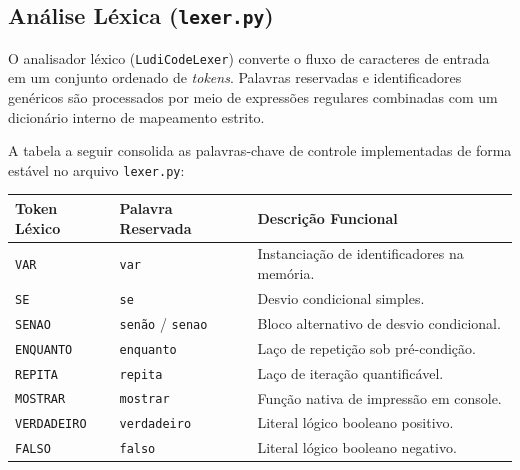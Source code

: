 \documentclass[12pt,a4paper]{article}
\begin{document}
\begin{center}
\end{center}

\subsection{Análise Léxica (\texttt{lexer.py})}

O analisador léxico (\texttt{LudiCodeLexer}) converte o fluxo de caracteres de entrada em um conjunto ordenado de \textit{tokens}. Palavras reservadas e identificadores genéricos são processados por meio de expressões regulares combinadas com um dicionário interno de mapeamento estrito.

A tabela a seguir consolida as palavras-chave de controle implementadas de forma estável no arquivo \texttt{lexer.py}:

\begin{center}
\begin{tabular}{llp{7cm}}
\hline
\textbf{Token Léxico} & \textbf{Palavra Reservada} & \textbf{Descrição Funcional} \\
\hline
\texttt{VAR}        & \texttt{var}       & Instanciação de identificadores na memória. \\
\texttt{SE}         & \texttt{se}        & Desvio condicional simples. \\
\texttt{SENAO}      & \texttt{senão} / \texttt{senao} & Bloco alternativo de desvio condicional. \\
\texttt{ENQUANTO}   & \texttt{enquanto}  & Laço de repetição sob pré-condição. \\
\texttt{REPITA}     & \texttt{repita}    & Laço de iteração quantificável. \\
\texttt{MOSTRAR}    & \texttt{mostrar}   & Função nativa de impressão em console. \\
\texttt{VERDADEIRO} & \texttt{verdadeiro}& Literal lógico booleano positivo. \\
\texttt{FALSO}      & \texttt{falso}     & Literal lógico booleano negativo. \\
\hline
\end{tabular}
\end{center}
\end{document}
